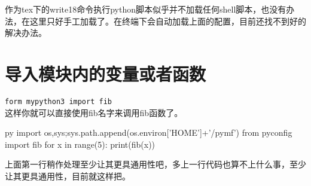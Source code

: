 \documentclass[12pt,oneside]{book}
\begin{document}
\begin{common-format}
作为tex下的write18命令执行python脚本似乎并不加载任何shell脚本，也没有办法，在这里只好手工加载了。在终端下会自动加载上面的配置，目前还找不到好的解决办法。


\section{导入模块内的变量或者函数}
\verb+form mypython3 import fib+\\
这样你就可以直接使用fib名字来调用fib函数了。
\begin{xverbatim}[129]{py}
import os,sys;sys.path.append(os.environ['HOME']+'/pymf')
from pyconfig import fib
for x in range(5):
    print(fib(x))
\end{xverbatim}
上面第一行稍作处理至少让其更具通用性吧，多上一行代码也算不上什么事，至少让其更具通用性，目前就这样把。


\end{common-format}  
\end{document}
